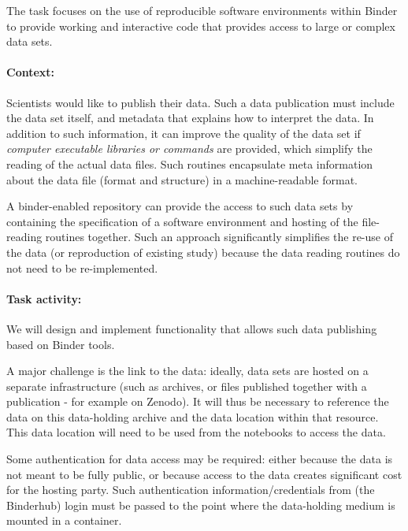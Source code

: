 \begin{task}[
  title=Data publishing,
  id=data-publishing,
  lead=MP,
  PM=8,
  partners={IFR,UIO}
  ]
  The task focuses on the use of reproducible software environments within
  Binder to provide working and interactive code that provides access to large
  or complex data sets.

  \paragraph*{Context:} Scientists would like to publish their data. Such a data
  publication must include the data set itself, and metadata that explains how to
  interpret the data. In addition to such information, it can improve the
  quality of the data set if \emph{computer executable libraries or commands}
  are provided, which simplify the reading of the actual data files. Such
  routines encapsulate meta information about the data file (format and
  structure) in a machine-readable format.

  A binder-enabled repository can provide the access to such data sets by
  containing the specification of a software environment and hosting of the
  file-reading routines together. Such an approach significantly simplifies the
  re-use of the data (or reproduction of existing study) because the data
  reading routines do not need to be re-implemented.

  \paragraph*{Task activity:}
  We will design and implement functionality that allows such data publishing
  based on Binder tools.

  A major challenge is the link to the data: ideally, data sets are hosted on a
  separate infrastructure (such as archives, or files published together with a
  publication - for example on Zenodo). It will thus be necessary to reference
  the data on this data-holding archive and the data location within that resource.
  This data location will need to be used from the notebooks to access
  the data. %

  Some authentication for data access may be required: either because the data
  is not meant to be fully public, or because access to the data creates
  significant cost for the hosting party. Such authentication
  information/credentials from (the Binderhub) login must be passed to the point
  where the data-holding medium is mounted in a container.


\end{task}
